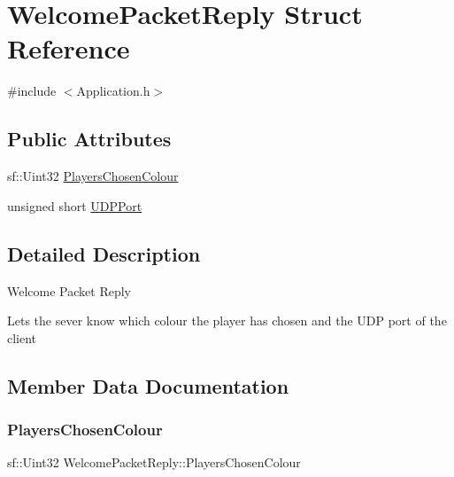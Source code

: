 \hypertarget{struct_welcome_packet_reply}{}\section{Welcome\+Packet\+Reply Struct Reference}
\label{struct_welcome_packet_reply}


{\ttfamily \#include $<$Application.\+h$>$}

\subsection*{Public Attributes}
\begin{DoxyCompactItemize}
\item 
sf\+::\+Uint32 \hyperlink{struct_welcome_packet_reply_aae57edcc680e3aa5a947cd26900c0d1b}{Players\+Chosen\+Colour}
\item 
unsigned short \hyperlink{struct_welcome_packet_reply_ad191136993f4f135eb199edfa5267814}{U\+D\+P\+Port}
\end{DoxyCompactItemize}


\subsection{Detailed Description}
Welcome Packet Reply

Lets the sever know which colour the player has chosen and the U\+DP port of the client 

\subsection{Member Data Documentation}
\hypertarget{struct_welcome_packet_reply_aae57edcc680e3aa5a947cd26900c0d1b}{}\label{struct_welcome_packet_reply_aae57edcc680e3aa5a947cd26900c0d1b} 
\subsubsection{\texorpdfstring{Players\+Chosen\+Colour}{PlayersChosenColour}}
{\footnotesize\ttfamily sf\+::\+Uint32 Welcome\+Packet\+Reply\+::\+Players\+Chosen\+Colour}

\hypertarget{struct_welcome_packet_reply_ad191136993f4f135eb199edfa5267814}{}\label{struct_welcome_packet_reply_ad191136993f4f135eb199edfa5267814} 
